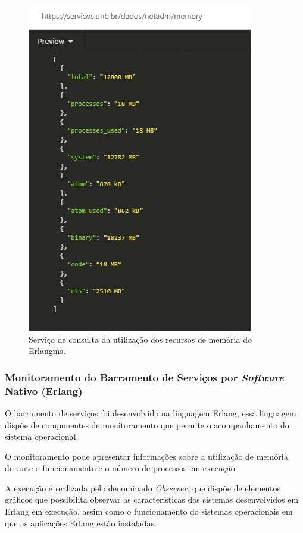 \begin{figure}[H]
	\begin{center}
	\includegraphics[scale = 0.90]{img/monitoramentoEMS.jpg}
		\caption{Serviço de consulta da utilização dos recursos de memória do Erlangms.}
		\label{fun:fig:memoriaEMS}
	\end{center}
\end{figure}

\subsubsection{Monitoramento do Barramento de Serviços por \textit{Software} Nativo (Erlang)}
O barramento de serviços foi desenvolvido na linguagem Erlang, essa linguagem dispõe de componentes de monitoramento que permite o acompanhamento do sistema operacional. 

O monitoramento pode apresentar informações sobre a utilização de memória durante o funcionamento e o número de processos em execução. 

A execução é realizada pelo denominado \textit{Observer}, que dispõe de elementos gráficos que possibilita observar as características dos sistemas desenvolvidos em Erlang \cite{ericssonAB2002-2019} em execução, assim como o funcionamento do sistemas operacionais em que as aplicações Erlang estão instaladas. 

